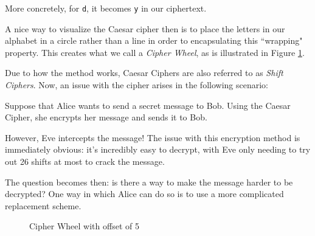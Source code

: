 \documentclass[openany]{book}
\begin{document}
More concretely, for \texttt{d}, it becomes \texttt{y} in our ciphertext.

A nice way to visualize the Caesar cipher then is to place the letters in our alphabet in a circle rather than a line in order to encapsulating this ``wrapping" property. This creates what we call a \textit{Cipher Wheel}, as is illustrated in Figure \ref{fig:1.1}.

Due to how the method works, Caesar Ciphers are also referred to as \textit{Shift Ciphers}. Now, an issue with the cipher arises in the following scenario:

Suppose that Alice wants to send a secret message to Bob. Using the Caesar Cipher, she encrypts her message and sends it to Bob.

However, Eve intercepts the message! The issue with this encryption method is immediately obvious: it's incredibly easy to decrypt, with Eve only needing to try out 26 shifts at most to crack the message.

The question becomes then: is there a way to make the message harder to be decrypted? One way in which Alice can do so is to use a more complicated replacement scheme.

\begin{figure}
	\begin{center}
		\caption{Cipher Wheel with offset of 5}
		\label{fig:1.1}
	\end{center}
\end{figure}
\end{document}
